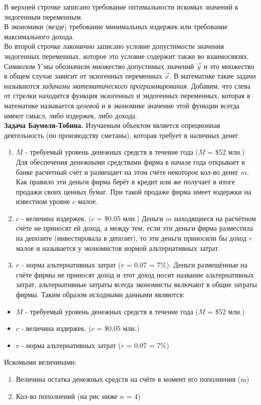 \documentclass[12pt,a4paper]{article}
\begin{document}
В верхней строчке записано требование оптимальности искомых значений к эндогенным переменным. \\
В экономики (везде) требование минимальных издержек или требование максимального дохода. \\
Во второй строчке лаконично записано условие допустимости значения эндогенных переменных, которое это условие содержит также во взаимосвязях. Символом $Y$ мы обозначили множество допустимых значений $\vec{y}$ и это множество в общем случае зависит от экзогенных переменных $\vec{x}$. В математике такие задачи называются \textit{задачами математического программирования}. Добавим, что слева от стрелки находится функция экзогенных и эндогенных переменных, которая в математике называется \textit{целевой} и в экономике значение этой функции всегда имеют смысл, либо издержек, либо дохода. \\
\textbf{Задача Баумоля-Тобина.} Изучаемым объектом является опреционная деятельность (по производству сметаны), которая требует в наличных денег.
\begin{enumerate}
\item $M$ - требуемый уровень денежных средств в течение года ($M$ = \$52 млн.) Для обеспечения денежными средствами фирма в начале года открывает в банке расчетный счёт и размещает на этом счёте некоторое кол-во денег $m$. Как правило эти деньги фирма берёт в кредит или же получает в итоге продажи своих ценных бумаг. При такой продаже фирма имеет издержки на известном уровне $c$ малое.
\item $c$ - величина издержек. ($c$ = \$0.05 млн.) Деньги $m$ находящиеся на расчётном счёте не приносят ей доход, а между тем, если эти деньги фирма разместила на депозите (инвестировала в депозит), то эти деньги приносили бы доход $r$ малое и называется у экономистов нормой альтернативных затрат.
\item $r$ - норма альтернативных затрат ($r$ = 0.07 = 7\%). Деньги размещённые на счёте фирмы не приносят доход и этот доход носит название альтернативных затрат, альтернативные затраты всегда экономисты включают в общие затраты фирмы. Таким образом исходными данными являются:
\end{enumerate}
\begin{itemize}
\item $M$ - требуемый уровень денежных средств в течение года ($M$ = \$52 млн.)
\item $c$ - величина издержек. ($c$ = \$0.05 млн.)
\item $r$ - норма альтернативных затрат ($r$ = 0.07 = 7\%)
\end{itemize}
Искомыми величинами:
\begin{enumerate}
\item Величина остатка денежных средств на счёте в момент его пополнения (m)
\item Кол-во пополнений (на рис ниже $n$ = 4)
\end{enumerate}
\end{document}
